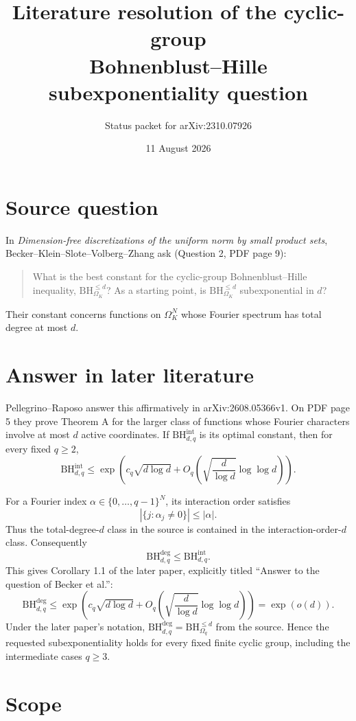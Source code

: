 \documentclass[11pt]{article}
\title{Literature resolution of the cyclic-group\\Bohnenblust--Hille subexponentiality question}
\author{Status packet for arXiv:2310.07926}
\date{11 August 2026}
\newcommand{\BHdeg}{\mathrm{BH}^{\mathrm{deg}}}
\newcommand{\BHint}{\mathrm{BH}^{\mathrm{int}}}
\begin{document}
\maketitle

\section*{Source question}

In \emph{Dimension-free discretizations of the uniform norm by small
product sets}, Becker--Klein--Slote--Volberg--Zhang ask (Question 2,
PDF page 9):
\begin{quote}
What is the best constant for the cyclic-group Bohnenblust--Hille
inequality, $\mathrm{BH}_{\Omega_K}^{\le d}$? As a starting point, is
$\mathrm{BH}_{\Omega_K}^{\le d}$ subexponential in $d$?
\end{quote}
Their constant concerns functions on $\Omega_K^N$ whose Fourier spectrum
has total degree at most $d$.

\section*{Answer in later literature}

Pellegrino--Raposo answer this affirmatively in arXiv:2608.05366v1.
On PDF page 5 they prove Theorem A for the larger class
of functions whose Fourier characters involve at most $d$ active
coordinates.  If $\BHint_{d,q}$ is its optimal constant, then for every
fixed $q\ge2$,
\[
 \BHint_{d,q}\le
 \exp\left(c_q\sqrt{d\log d}
 +O_q\left(\sqrt{\frac d{\log d}}\log\log d\right)\right).
\]

For a Fourier index $\alpha\in\{0,\ldots,q-1\}^N$, its interaction
order satisfies
\[
 |\{j:\alpha_j\ne0\}|\le |\alpha|.
\]
Thus the total-degree-$d$ class in the source is contained in the
interaction-order-$d$ class.  Consequently
\[
 \BHdeg_{d,q}\le\BHint_{d,q}.
\]
This gives Corollary 1.1 of the later paper, explicitly titled
``Answer to the question of Becker et al.'':
\[
 \BHdeg_{d,q}\le
 \exp\left(c_q\sqrt{d\log d}
 +O_q\left(\sqrt{\frac d{\log d}}\log\log d\right)\right)
 =\exp(o(d)).
\]
Under the later paper's notation,
$\BHdeg_{d,q}=\mathrm{BH}_{\Omega_q}^{\le d}$ from the source.  Hence
the requested subexponentiality holds for every fixed finite cyclic
group, including the intermediate cases $q\ge3$.

\section*{Scope}
\end{document}
